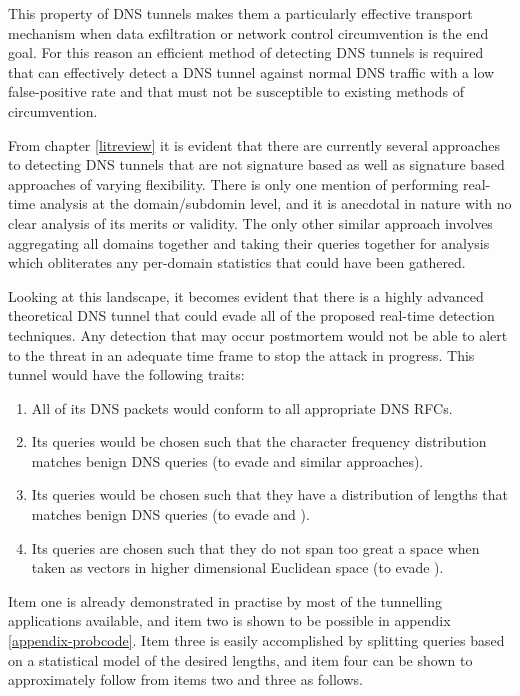 \documentclass[12pt]{report}
\theoremstyle{remark}
\theoremstyle{definition}
\theoremstyle{definition}
\theoremstyle{definition}
\begin{document}
This property of DNS tunnels makes them a particularly effective transport
mechanism when data exfiltration or network control circumvention is the end
goal. For this reason an efficient method of detecting DNS tunnels is required
that can effectively detect a DNS tunnel against normal DNS traffic with a low
false-positive rate and that must not be susceptible to existing methods of
circumvention.

From chapter \ref{litreview} it is evident that there are currently several
approaches to detecting DNS tunnels that are not signature based as well as
signature based approaches of varying flexibility. There is only one mention of
performing real-time analysis at the domain/subdomin level, and it is anecdotal
in nature with no clear analysis of its merits or validity. The only other
similar approach involves aggregating all domains together and taking their
queries together for analysis which obliterates any per-domain statistics that
could have been gathered.

Looking at this landscape, it becomes evident that there is a highly advanced
theoretical DNS tunnel that could evade all of the proposed real-time detection
techniques. Any detection that may occur postmortem would not be able to alert
to the threat in an adequate time frame to stop the attack in progress. This
tunnel would have the following traits:

\label{supertunnel}
\begin{enumerate} \item All of its DNS packets would conform
to all appropriate DNS RFCs. \item Its queries would be chosen such that the
character frequency distribution matches benign DNS queries (to evade
\cite{Born2010.cfa} and similar approaches). \item Its queries would be chosen
such that they have a distribution of lengths that matches benign DNS queries
(to evade \cite{Karasaridis2006} and \cite{SANS2013}). \item Its queries are
chosen such that they do not span too great a space when taken as vectors in
higher dimensional Euclidean space (to evade \cite{jhind2009}). \end{enumerate}

Item one is already demonstrated in practise by most of the tunnelling
applications available, and item two is shown to be possible in appendix
\ref{appendix-probcode}. Item three is easily accomplished by splitting queries based
on a statistical model of the desired lengths, and item four can be shown to
approximately follow from items two and three as follows.
\end{document}
